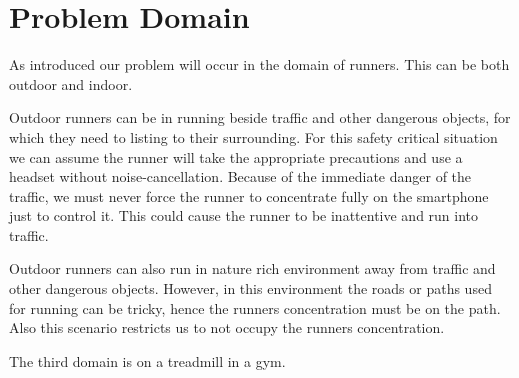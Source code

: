 \section{Problem Domain}
As introduced our problem will occur in the domain of runners. 
This can be both outdoor and indoor.

Outdoor runners can be in running beside traffic and other dangerous objects, for which they need to listing to their surrounding.
For this safety critical situation we can assume the runner will take the appropriate precautions and use a headset without noise-cancellation.
Because of the immediate danger of the traffic, we must never force the runner to concentrate fully on the smartphone just to control it. 
This could cause the runner to be inattentive and run into traffic.

Outdoor runners can also run in nature rich environment away from traffic and other dangerous objects. 
However, in this environment the roads or paths used for running can be tricky, hence the runners concentration must be on the path.
Also this scenario restricts us to not occupy the runners concentration.

The third domain is on a treadmill in a gym.
